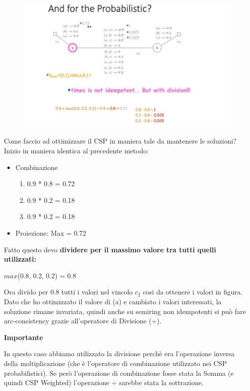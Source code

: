 \begin{figure}[htp]
	\centering
    \includegraphics[width=12cm, keepaspectratio]{img/Cap5/Probabilistic2.png}
\end{figure}
Come faccio ad ottimizzare il CSP in maniera tale da mantenere le soluzioni?
\\Inizio in maniera identica al precedente metodo:
\begin{itemize}
    \item Combinazione
    \begin{enumerate}
        \item 0.9 * 0.8 = 0.72
        \item 0.9 * 0.2 = 0.18
        \item 0.9 * 0.2 = 0.18
    \end{enumerate}
    \item Proiezione: Max = 0.72
\end{itemize}
\newpage
Fatto questo devo \textbf{dividere per il massimo valore tra tutti quelli utilizzati:}
\begin{center}
    $max$(0.8, 0.2, 0.2) = 0.8
\end{center}
Ora divido per 0.8 tutti i valori nel vincolo $c_2$ cosi da ottenere i valori in figura. Dato che ho ottimizzato il valore di (a) e cambiato i valori interessati, la soluzione rimane invariata, quindi anche su semiring non idempotenti si può fare arc-consistency grazie all'operatore di Divisione ($\div$).
\begin{center}
    \textbf{Importante}
\end{center}
In questo caso abbiamo utilizzato la divisione perchè era l'operazione inversa della moltiplicazione (che è l’operatore di combinazione utilizzato nei CSP probabilistici). Se però l’operazione di combinazione fosse stata la Somma (e quindi CSP Weighted) l’operazione $\div$ sarebbe stata la sottrazione.